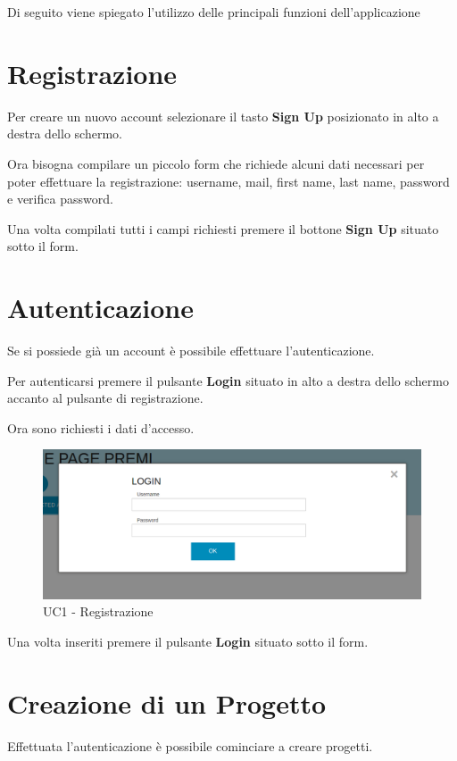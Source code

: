 Di seguito viene spiegato l'utilizzo delle principali funzioni dell'applicazione
\section{Registrazione}
Per creare un nuovo account selezionare il tasto \textbf{Sign Up} posizionato in alto a destra dello schermo.

\noindent Ora bisogna compilare un piccolo form che richiede alcuni dati necessari per poter effettuare la registrazione: username, mail, first name, last name, password e verifica password.

\noindent Una volta compilati tutti i campi richiesti premere il bottone \textbf{Sign Up} situato sotto il form.

\section{Autenticazione}
Se si possiede già un account è possibile effettuare l'autenticazione.

\noindent Per autenticarsi premere il pulsante \textbf{Login} situato in alto a destra dello schermo accanto al pulsante di registrazione.

\noindent Ora sono richiesti i dati d'accesso.

\begin{figure}[h] 
	\centering 
	\includegraphics[scale=0.40] {img/MULogin.png}
	\caption{UC1 - Registrazione} 
\end{figure}

\noindent Una volta inseriti premere il pulsante \textbf{Login} situato sotto il form.

\section{Creazione di un Progetto}

Effettuata l'autenticazione è possibile cominciare a creare progetti.


